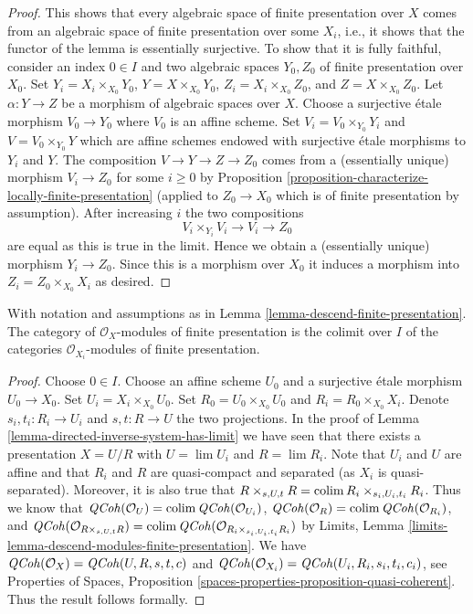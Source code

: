 \begin{proof}
\medskip\noindent
This shows that every algebraic space of finite presentation over $X$ comes
from an algebraic space of finite presentation over some $X_i$, i.e.,
it shows that the functor of the lemma is essentially surjective. To
show that it is fully faithful, consider an index $0 \in I$ and two
algebraic spaces $Y_0, Z_0$ of finite presentation over $X_0$.
Set $Y_i = X_i \times_{X_0} Y_0$, $Y = X \times_{X_0} Y_0$,
$Z_i = X_i \times_{X_0} Z_0$, and $Z = X \times_{X_0} Z_0$. Let
$\alpha : Y \to Z$ be a morphism of algebraic spaces over $X$.
Choose a surjective \'etale morphism $V_0 \to Y_0$ where $V_0$ is
an affine scheme. Set $V_i = V_0 \times_{Y_0} Y_i$ and
$V = V_0 \times_{Y_0} Y$ which are affine schemes endowed with
surjective \'etale morphisms to $Y_i$ and $Y$. The composition
$V \to Y \to Z \to Z_0$ comes from a (essentially unique) morphism
$V_i \to Z_0$ for some $i \geq 0$ by
Proposition \ref{proposition-characterize-locally-finite-presentation}
(applied to $Z_0 \to X_0$ which is of finite presentation by assumption).
After increasing $i$ the two compositions
$$
V_i \times_{Y_i} V_i \to V_i \to Z_0
$$
are equal as this is true in the limit. Hence we obtain a (essentially unique)
morphism $Y_i \to Z_0$. Since this is a morphism over $X_0$
it induces a morphism into $Z_i = Z_0 \times_{X_0} X_i$ as desired.
\end{proof}

\begin{lemma}
\label{lemma-descend-modules-finite-presentation}
With notation and assumptions as in
Lemma \ref{lemma-descend-finite-presentation}.
The category of $\mathcal{O}_X$-modules of finite presentation is the
colimit over $I$ of the categories $\mathcal{O}_{X_i}$-modules of finite
presentation.
\end{lemma}

\begin{proof}
Choose $0 \in I$. Choose an affine scheme $U_0$ and a surjective
\'etale morphism $U_0 \to X_0$. Set $U_i = X_i \times_{X_0} U_0$.
Set $R_0 = U_0 \times_{X_0} U_0$ and $R_i = R_0 \times_{X_0} X_i$.
Denote $s_i, t_i : R_i \to U_i$ and $s, t : R \to U$ the two
projections. In the proof of
Lemma \ref{lemma-directed-inverse-system-has-limit} we have
seen that there exists a presentation $X = U/R$ with
$U = \lim U_i$ and $R = \lim R_i$. Note that $U_i$ and $U$ are affine and
that $R_i$ and $R$ are quasi-compact and separated (as $X_i$ is
quasi-separated). Moreover, it is also true that
$R \times_{s, U, t} R = \mathop{\mathrm{colim}}\nolimits R_i \times_{s_i, U_i, t_i} R_i$.
Thus we know that
$\mathit{QCoh}(\mathcal{O}_U) = \mathop{\mathrm{colim}}\nolimits \mathit{QCoh}(\mathcal{O}_{U_i})$,
$\mathit{QCoh}(\mathcal{O}_R) = \mathop{\mathrm{colim}}\nolimits \mathit{QCoh}(\mathcal{O}_{R_i})$,
and
$\mathit{QCoh}(\mathcal{O}_{R \times_{s, U, t} R}) =
\mathop{\mathrm{colim}}\nolimits \mathit{QCoh}(\mathcal{O}_{R_i \times_{s_i, U_i, t_i} R_i})$ by
Limits, Lemma \ref{limits-lemma-descend-modules-finite-presentation}.
We have $\mathit{QCoh}(\mathcal{O}_X) = \mathit{QCoh}(U, R, s, t, c)$ and
$\mathit{QCoh}(\mathcal{O}_{X_i}) = \mathit{QCoh}(U_i, R_i, s_i, t_i, c_i)$,
see Properties of Spaces, Proposition
\ref{spaces-properties-proposition-quasi-coherent}.
Thus the result follows formally.
\end{proof}

